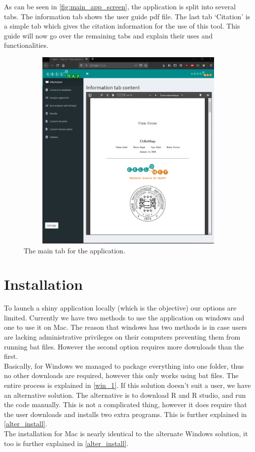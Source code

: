 \documentclass[11pt]{article}
\begin{document}
As can be seen in \autoref{fig:main_app_screen}, the application is split into several tabs. The information tab shows the user guide pdf file. The last tab `Citation' is a simple tab which gives the citation information for the use of this tool. This guide will now go over the remaining tabs and explain their uses and functionalities.
\begin{figure}[h!]
\centering
\includegraphics[width=15cm,height=10cm,keepaspectratio]{main_app_screen.png}
\caption{The main tab for the application.}
\label{fig:main_app_screen}
\end{figure}

\section{Installation \label{install}}
To launch a shiny application locally (which is the objective) our options are limited. Currently we have two methods to use the application on windows and one to use it on Mac.
The reason that windows has two methods is in case users are lacking administrative privileges on their computers preventing them from running bat files. However the second option requires more downloads than the first.\\
Basically, for Windows we managed to package everything into one folder, thus no other downloads are required, however this only works using bat files. The entire process is explained in \autoref{win_1}.
If this solution doesn't suit a user, we have an alternative solution. The alternative is to download R and R studio, and run the code manually. This is not a complicated thing, however it does require that the user downloads and installs two extra programs. This is further explained in \autoref{alter_install}.\\
The installation for Mac is nearly identical to the alternate Windows solution, it too is further explained in \autoref{alter_install}.
\end{document}

